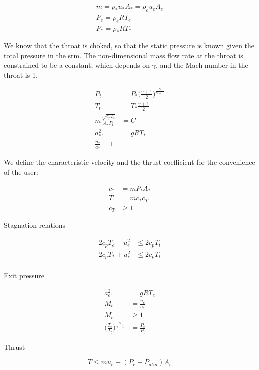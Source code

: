 \begin{align}
    \dot{m} = \rho_* u_* A_* = \rho_e u_e A_e \\
    P_e = \rho_e R T_e \\
    P_* = \rho_* R T_*
\end{align}

We know that the throat is choked, so that the static pressure
is known given the total pressure in the \gls{srm}. The non-dimensional
mass flow rate at the throat is constrained to be a constant,
which depends on $\gamma$, and the Mach number in the throat is 1.

\begin{align}
    P_t &= P_* \Big(\frac{\gamma + 1}{2}\Big)^{\frac{\gamma}{\gamma-1}} \\
    T_t &= T_* \frac{\gamma + 1}{2} \\
    \dot{m} \frac{\sqrt{c_p T_t}}{A_* P_t} &= C \\
    a_*^2. &= gRT_* \\
    \frac{u_*}{a_*} = 1
\end{align}

We define the characteristic velocity and the thrust coefficient for the
convenience of the user:

\begin{align}
    c_* &= \dot{m} P_t A_* \\
    T &= \dot{m} c_* c_T \\
    c_T &\geq 1
\end{align}

Stagnation relations

\begin{align}
    2 c_p T_e + u_e^2 &\leq 2 c_p T_t \\
    2 c_p T_* + u_*^2 &\leq 2 c_p T_t \\
\end{align}

Exit pressure

\begin{align}
    a_e^2. &= gRT_e \\
    M_e &= \frac{u_e}{a_e} \\
    M_e &\geq 1 \\
    \Big(\frac{T_e}{T_t}\Big)^{\frac{\gamma}{\gamma-1}} &= \frac{P_e}{P_t}
\end{align}

Thrust

\begin{equation}
    T \leq \dot{m} u_e + (P_e - P_{atm}) A_e
\end{equation}


